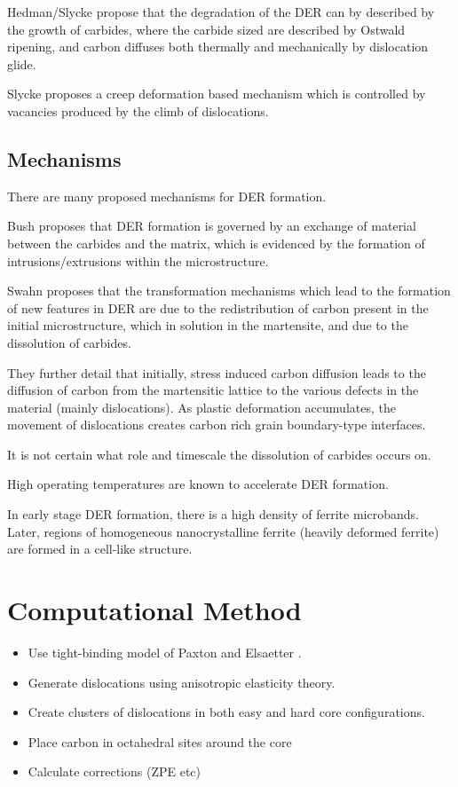 \documentclass[a4paper]{article}
\begin{document}
Hedman/Slycke propose that the degradation of the DER can by
described by the growth of carbides, where the carbide sized are
described by Ostwald ripening, and carbon diffuses both thermally
and mechanically by dislocation glide. 

Slycke proposes a creep deformation based mechanism which is
controlled by vacancies produced by the climb of dislocations. 


\subsection{Mechanisms}
\label{sec:org082d1e0}

There are many proposed mechanisms for DER formation.

Bush proposes that DER formation is governed by an
exchange of material between the carbides and the matrix, which is
evidenced by the formation of intrusions/extrusions within the
microstructure. 

Swahn proposes that the transformation mechanisms which lead to the
formation of new features in DER are due to the redistribution of
carbon present in the initial microstructure, which in solution in
the martensite, and due to the dissolution of carbides. 

They further detail that initially, stress induced carbon diffusion
leads to the diffusion of carbon from the martensitic lattice to
the various defects in the material (mainly dislocations). 
As plastic deformation accumulates, the movement of dislocations
creates carbon rich grain boundary-type interfaces. 

It is not certain what role and timescale the dissolution of
carbides occurs on. 

High operating temperatures are known to accelerate DER formation. 

In early stage DER formation, there is a high density of ferrite
microbands. Later, regions of homogeneous nanocrystalline ferrite
(heavily deformed ferrite) are formed in a cell-like structure.







\section{Computational Method}
\label{sec:orgeed92d8}

\begin{itemize}
\item Use tight-binding model of Paxton and Elsaetter \cite{Paxton2013}.
\item Generate dislocations using anisotropic elasticity theory.
\item Create clusters of dislocations in both easy and hard core
configurations.
\item Place carbon in octahedral sites around the core
\item Calculate corrections (ZPE etc)
\end{itemize}
\end{document}
